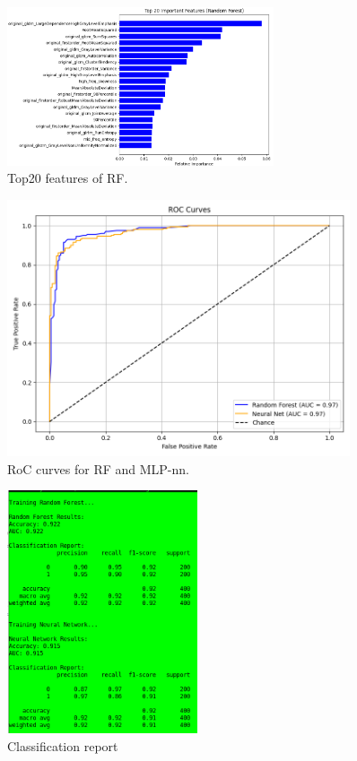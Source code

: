 \documentclass[11pt,a4paper]{article}
\begin{document}
		\begin{figure}[H]
			\centering
			\includegraphics[width=0.7\textwidth]{images/top20features_all_features_rf.png}
			\caption{Top20 features of RF.}
			\label{fig1:}
		\end{figure}		

		\begin{figure}[H]
			\centering
			\includegraphics[width=0.9\textwidth]{images/roc_curves_all_features.png}
			\caption{RoC curves for RF and MLP-nn.}
			\label{fig1:}
		\end{figure}		

		\begin{figure}[H]
			\centering
			\includegraphics[width=0.5\textwidth]{images/report_all_features.png}
			\caption{Classification report}
			\label{fig1:}
		\end{figure}		
\end{document}
